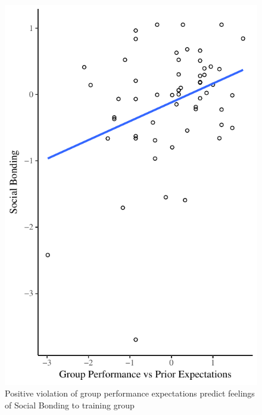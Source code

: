 \begin{figure}
  \centering
  \includegraphics{images/groupPerfExpBondConditionScatter}
\caption[Positive violation of group performance expectations
 predict feelings of Social Bonding to training group]{Positive violation of group performance expectations
 predict feelings of Social Bonding to training group}
 \label{fig:groupPerfExpBondConditionScatter}
\end{figure}




